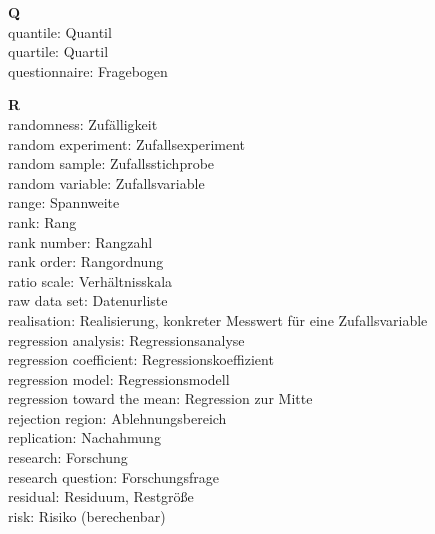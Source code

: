 \pagebreak
\medskip
\noindent
{\bf Q}\\
quantile: Quantil\\
quartile: Quartil\\
questionnaire: Fragebogen

\medskip
\noindent
{\bf R}\\
randomness: Zuf\"{a}lligkeit\\
random experiment: Zufallsexperiment\\
random sample: Zufallsstichprobe\\
random variable: Zufallsvariable\\
range: Spannweite\\
rank: Rang\\
rank number: Rangzahl\\
rank order: Rangordnung\\
ratio scale: Verh\"{a}ltnisskala\\
raw data set: Datenurliste\\
realisation: Realisierung, konkreter Messwert f\"{u}r eine 
Zufallsvariable\\
regression analysis: Regressionsanalyse\\
regression coefficient: Regressionskoeffizient\\
regression model: Regressionsmodell\\
regression toward the mean: Regression zur Mitte\\
rejection region: Ablehnungsbereich\\
replication: Nachahmung\\
research: Forschung\\
research question: Forschungsfrage\\
residual: Residuum, Restgr\"{o}\ss e\\
risk: Risiko (berechenbar)

